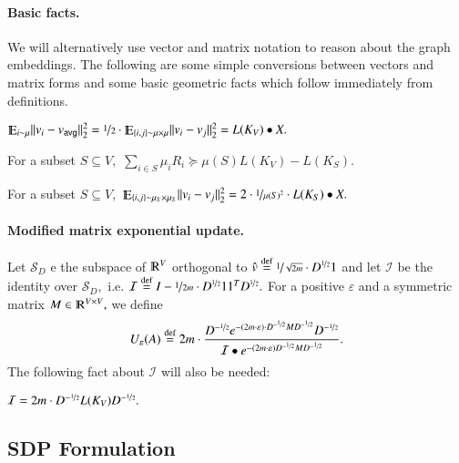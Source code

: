 \documentclass[twoside,leqno,twocolumn]{article}
\newcommand{\nfrac}{\nicefrac}
\renewcommand{\mathbb}{\varmathbb}
\newcommand{\cI}{\mathcal I}
\newcommand{\cS}{\mathcal S}
\newcommand{\norm}[1]{\lVert#1\rVert}
\newcommand{\defeq}{\stackrel{\textup{def}}{=}}
\newcommand{\R}{\mathbb R}
\newcommand{\Esymb}{\mathbb{E}}
\DeclareMathOperator*{\E}{\Esymb}
\newcommand{\e}{\epsilon}
\let\e\varepsilon
\newcommand{\SDP}{{\sf SDP}\xspace}
\newcommand{\Deg}{D^{\nfrac{1}{2}}}
\newcommand{\Degin}{D^{-\nfrac{1}{2}}}
\numberwithin{equation}{section}
\newcommand{\avg}{{\ensuremath{\mathsf{avg}}\xspace}}
\begin{document}
\paragraph{Basic facts.} We will alternatively use vector and matrix notation to reason about the graph embeddings. 
The following are some simple conversions between vectors and matrix forms and some basic geometric facts which follow immediately from definitions.
\begin{fact}\label{fct:mean}
$ \E_{i \sim \mu}\norm{v_i - v_\avg}_2^2 = \nfrac{1}{2} \cdot \E_{\{i,j\} \sim \mu \times \mu}\norm{v_i - v_j}_2^2 = L(K_V) \bullet X.$
\end{fact}
\begin{fact} \label{fct:star} For a subset $S \subseteq V,$ 
$\sum_{i \in S} \mu_i R_i \succeq \mu(S) L(K_V) - L(K_S).$
\end{fact}
\begin{fact} \label{fct:subset}
For a subset $S \subseteq V,$ $ \E_{\{i,j\} \sim \mu_S \times \mu_S}\norm{v_i - v_j}_2^2 = 2 \cdot \nfrac{1}{\mu(S)^2} \cdot L(K_S) \bullet X.$
\end{fact}



\paragraph{Modified matrix exponential update.}
Let $\cS_D$ e the subspace of $\R^V$ orthogonal to $\hat{v} \defeq \nfrac{1}{\sqrt{2m}} \cdot \Deg 1$ and let $\cI$ be the identity over $\cS_D,$ i.e. $\cI \defeq I - \nfrac{1}{2m} \cdot \Deg 1 1^T \Deg.$
 For a positive $\e$ and a symmetric matrix $M \in \R^{V \times V},$ we define 
$$
U_{\e}(A) \defeq 2m \cdot \frac{\Degin e^{-(2m \cdot \e) \cdot \Degin M \Degin } \Degin}{\cI \bullet e^{-(2m \cdot \e) \Degin M \Degin}}.
$$
The following fact about $\cI$ will also be needed:
\begin{fact}\label{fct:identity}
$ \cI = 2m \cdot \Degin L(K_V) \Degin.$
\end{fact}

\subsection{\SDP Formulation} \label{sec:sdp}
\end{document}
